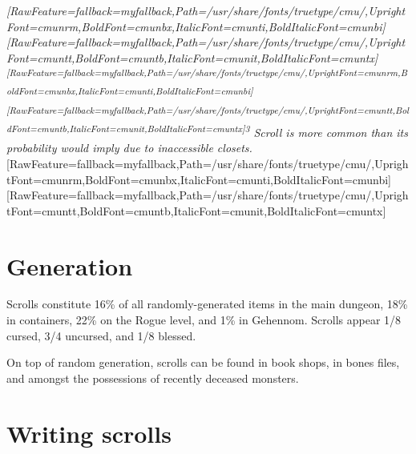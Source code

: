 {\itshape \allowbreak{}\setmainfont{cmunrm.ttf}[RawFeature={fallback=myfallback},Path=/usr/share/fonts/truetype/cmu/,UprightFont=cmunrm,BoldFont=cmunbx,ItalicFont=cmunti,BoldItalicFont=cmunbi]\setmonofont{cmunrm.ttf}[RawFeature={fallback=myfallback},Path=/usr/share/fonts/truetype/cmu/,UprightFont=cmuntt,BoldFont=cmuntb,ItalicFont=cmunit,BoldItalicFont=cmuntx]\textsuperscript{\allowbreak{}\setmainfont{cmunti.ttf}[RawFeature={fallback=myfallback},Path=/usr/share/fonts/truetype/cmu/,UprightFont=cmunrm,BoldFont=cmunbx,ItalicFont=cmunti,BoldItalicFont=cmunbi]\setmonofont{cmunti.ttf}[RawFeature={fallback=myfallback},Path=/usr/share/fonts/truetype/cmu/,UprightFont=cmuntt,BoldFont=cmuntb,ItalicFont=cmunit,BoldItalicFont=cmuntx]\itshape 3} Scroll is more common than its probability would imply due to inaccessible closets\footnotemark[67].}\allowbreak{}\setmainfont{cmunrm.ttf}[RawFeature={fallback=myfallback},Path=/usr/share/fonts/truetype/cmu/,UprightFont=cmunrm,BoldFont=cmunbx,ItalicFont=cmunti,BoldItalicFont=cmunbi]\setmonofont{cmunrm.ttf}[RawFeature={fallback=myfallback},Path=/usr/share/fonts/truetype/cmu/,UprightFont=cmuntt,BoldFont=cmuntb,ItalicFont=cmunit,BoldItalicFont=cmuntx]



\section{Generation}
\label{2}
Scrolls constitute 16\% of all randomly-{}generated items in the main dungeon, 18\% in containers, 22\% on the Rogue level, and 1\% in Gehennom. Scrolls appear 1/8 cursed, 3/4 uncursed, and 1/8 blessed.


On top of random generation, scrolls can be found in book shops\footnotemark[68], in bones\footnotemark[69] files, and amongst the possessions of recently deceased monsters.



\section{Writing scrolls}
\label{3}


